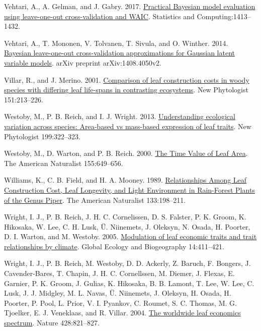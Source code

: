 \documentclass[
  12pt,
  a4paper,
,tablecaptionabove
]{scrartcl}
\newlength{\cslhangindent}
\newenvironment{CSLReferences}[2] %
 {%
  \setlength{\parindent}{0pt}
  \ifodd #1 \everypar{\setlength{\hangindent}{\cslhangindent}}\ignorespaces\fi
  \ifnum #2 > 0
  \setlength{\parskip}{#2\baselineskip}
  \fi
 }%
 {}
\begin{document}
\begin{CSLReferences}{1}{0}
\leavevmode{}%
Vehtari, A., A. Gelman, and J. Gabry. 2017.
\href{https://doi.org/10.1007/s11222-016-9696-4}{Practical {Bayesian}
model evaluation using leave-one-out cross-validation and {WAIC}}.
Statistics and Computing:1413--1432.

\leavevmode{}%
Vehtari, A., T. Mononen, V. Tolvanen, T. Sivula, and O. Winther. 2014.
\href{https://arxiv.org/abs/1408.4050v2}{Bayesian leave-one-out
cross-validation approximations for {Gaussian} latent variable models}.
arXiv preprint arXiv:1408.4050v2.

\leavevmode{}%
Villar, R., and J. Merino. 2001.
\href{https://doi.org/10.1046/j.1469-8137.2001.00147.x}{Comparison of
leaf construction costs in woody species with differing leaf life-spans
in contrasting ecosystems}. New Phytologist 151:213--226.

\leavevmode{}%
Westoby, M., P. B. Reich, and I. J. Wright. 2013.
\href{https://doi.org/10.1111/nph.12345}{Understanding ecological
variation across species: {Area-based} vs mass-based expression of leaf
traits}. New Phytologist 199:322--323.

\leavevmode{}%
Westoby, M., D. Warton, and P. B. Reich. 2000.
\href{https://doi.org/10.1086/303346}{The {Time Value} of {Leaf Area}}.
The American Naturalist 155:649--656.

\leavevmode{}%
Williams, K., C. B. Field, and H. A. Mooney. 1989.
\href{https://doi.org/10.1086/284910}{Relationships {Among Leaf
Construction Cost}, {Leaf Longevity}, and {Light Environment} in
{Rain-Forest Plants} of the {Genus Piper}}. The American Naturalist
133:198--211.

\leavevmode{}%
Wright, I. J., P. B. Reich, J. H. C. Cornelissen, D. S. Falster, P. K.
Groom, K. Hikosaka, W. Lee, C. H. Lusk, Ü. Niinemets, J. Oleksyn, N.
Osada, H. Poorter, D. I. Warton, and M. Westoby. 2005.
\href{https://doi.org/10.1111/j.1466-822x.2005.00172.x}{Modulation of
leaf economic traits and trait relationships by climate}. Global Ecology
and Biogeography 14:411--421.

\leavevmode{}%
Wright, I. J., P. B. Reich, M. Westoby, D. D. Ackerly, Z. Baruch, F.
Bongers, J. Cavender-Bares, T. Chapin, J. H. C. Cornellssen, M. Diemer,
J. Flexas, E. Garnier, P. K. Groom, J. Gulias, K. Hikosaka, B. B.
Lamont, T. Lee, W. Lee, C. Lusk, J. J. Midgley, M. L. Navas, Ü.
Niinemets, J. Oleksyn, H. Osada, H. Poorter, P. Pool, L. Prior, V. I.
Pyankov, C. Roumet, S. C. Thomas, M. G. Tjoelker, E. J. Veneklaas, and
R. Villar. 2004. \href{https://doi.org/10.1038/nature02403}{The
worldwide leaf economics spectrum}. Nature 428:821--827.


\end{CSLReferences}
\end{document}
